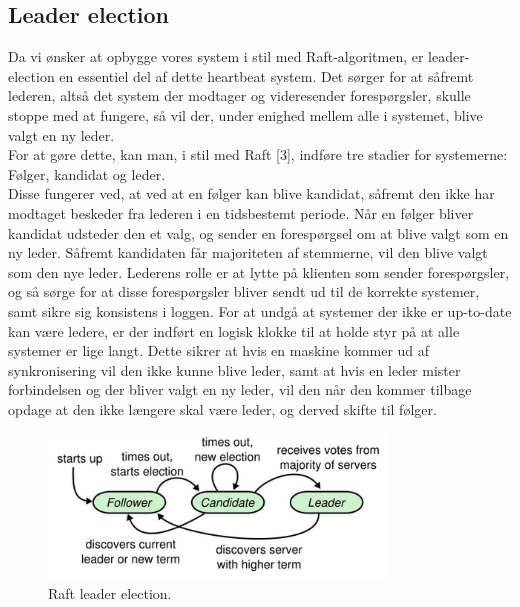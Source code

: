 \documentclass[a4paper,12pt]{article}
\begin{document}
\subsection{Leader election} 
Da vi ønsker at opbygge vores system i stil med Raft-algoritmen, er leader-election en essentiel del af dette heartbeat system. Det sørger for at såfremt lederen, altså det system der modtager og videresender forespørgsler, skulle stoppe med at fungere, så vil der, under enighed mellem alle i systemet, blive valgt en ny leder.
  \\
For at gøre dette, kan man, i stil med Raft [3], indføre tre stadier for systemerne:
  \\
Følger, kandidat og leder.
  \\
Disse fungerer ved, at ved at en følger kan blive kandidat, såfremt den ikke har modtaget beskeder fra lederen i en tidsbestemt periode. Når en følger bliver kandidat udsteder den et valg, og sender en forespørgsel om at blive valgt som en ny leder. Såfremt kandidaten får majoriteten af stemmerne, vil den blive valgt som den nye leder. 
Lederens rolle er at lytte på klienten som sender forespørgsler, og så sørge for at disse forespørgsler bliver sendt ud til de korrekte systemer, samt sikre sig konsistens i loggen. 
For at undgå at systemer der ikke er up-to-date kan være ledere, er der indført en logisk klokke til at holde styr på at alle systemer er lige langt. 
Dette sikrer at hvis en maskine kommer ud af synkronisering vil den ikke kunne blive leder, samt at hvis en leder mister forbindelsen og der bliver valgt en ny leder, vil den når den kommer tilbage opdage at den ikke længere skal være leder, og derved skifte til følger.
\\
\begin{figure}[H]
  \caption{Raft leader election.}
  \centering
    \includegraphics[width=0.8\textwidth]{Raftleaderelection.png}
\end{figure}
\end{document}
